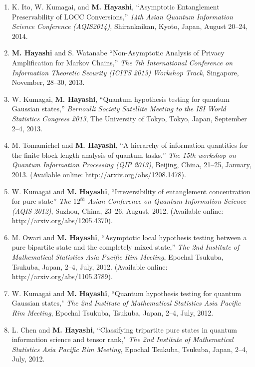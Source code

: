 \documentclass[a4paper,12pt,oneside]{article}
\begin{document}
\begin{enumerate}
\item 
K. Ito, W. Kumagai, and \textbf{M. Hayashi}, 
``Asymptotic Entanglement Preservability of LOCC Conversions,'' 
{\em 14th Asian Quantum Information Science Conference (AQIS2014),} Shirankaikan, Kyoto, Japan, August 20--24, 2014.

\item 
\textbf{M. Hayashi} and S. Watanabe
``Non-Asymptotic Analysis of Privacy Amplification for Markov Chains,''
{\em The 7th International Conference on Information Theoretic Security (ICITS 2013) Workshop Track},
Singapore, November, 28--30, 2013.

\item
W. Kumagai, \textbf{M. Hayashi}, 
``Quantum hypothesis testing for quantum Gaussian states,'' 
{\em Bernoulli Society Satellite Meeting to the ISI World Statistics Congress 2013}, 
The University of Tokyo, Tokyo, Japan,
September 2--4, 2013.

\item 
M. Tomamichel and \textbf{M. Hayashi}, ``A hierarchy of information quantities for the finite block length analysis of quantum tasks,''
{\em The 15th workshop on Quantum Information Processing (QIP 2013)}, Beijing, China, 21--25, January, 2013.
(Available online: http://arxiv.org/abs/1208.1478).

\item 
W. Kumagai and \textbf{M. Hayashi}, ``Irreversibility of entanglement concentration for pure state''
{\em The $12^{th}$ Asian Conference on Quantum Information Science (AQIS 2012)},
Suzhou, China, 23--26, August, 2012.
(Available online: http://arxiv.org/abs/1205.4370).

\item 
M. Owari and \textbf{M. Hayashi}, 
``Asymptotic local hypothesis testing between a pure bipartite state and the completely mixed state,''
{\em The 2nd Institute of Mathematical Statistics Asia Pacific Rim Meeting}, 
Epochal Tsukuba, Tsukuba, Japan, 2--4, July, 2012.
(Available online: http://arxiv.org/abs/1105.3789).

\item 
W. Kumagai and \textbf{M. Hayashi}, 
``Quantum hypothesis testing for quantum Gaussian states," 
{\em The 2nd Institute of Mathematical Statistics Asia Pacific Rim Meeting}, 
Epochal Tsukuba, Tsukuba, Japan, 2--4, July, 2012.

\item 
L. Chen and \textbf{M. Hayashi}, 
``Classifying tripartite pure states in quantum information science and tensor rank," 
{\em The 2nd Institute of Mathematical Statistics Asia Pacific Rim Meeting}, 
Epochal Tsukuba, Tsukuba, Japan, 2--4, July, 2012.


\end{enumerate}
\end{document}
